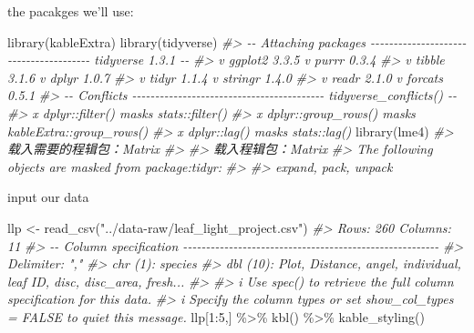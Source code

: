 \documentclass[
]{article}
\newenvironment{Shaded}{\begin{snugshade}}{\end{snugshade}}
\newcommand{\CommentTok}[1]{\textcolor[rgb]{0.56,0.35,0.01}{\textit{#1}}}
\newcommand{\DecValTok}[1]{\textcolor[rgb]{0.00,0.00,0.81}{#1}}
\newcommand{\FunctionTok}[1]{\textcolor[rgb]{0.00,0.00,0.00}{#1}}
\newcommand{\NormalTok}[1]{#1}
\newcommand{\OtherTok}[1]{\textcolor[rgb]{0.56,0.35,0.01}{#1}}
\newcommand{\SpecialCharTok}[1]{\textcolor[rgb]{0.00,0.00,0.00}{#1}}
\newcommand{\StringTok}[1]{\textcolor[rgb]{0.31,0.60,0.02}{#1}}
\begin{document}
the pacakges we'll use:

\begin{Shaded}
\begin{Highlighting}[]
\FunctionTok{library}\NormalTok{(kableExtra)}
\FunctionTok{library}\NormalTok{(tidyverse)}
\CommentTok{\#\textgreater{} {-}{-} Attaching packages {-}{-}{-}{-}{-}{-}{-}{-}{-}{-}{-}{-}{-}{-}{-}{-}{-}{-}{-}{-}{-}{-}{-}{-}{-}{-}{-}{-}{-}{-}{-}{-}{-}{-}{-}{-}{-}{-}{-} tidyverse 1.3.1 {-}{-}}
\CommentTok{\#\textgreater{} v ggplot2 3.3.5     v purrr   0.3.4}
\CommentTok{\#\textgreater{} v tibble  3.1.6     v dplyr   1.0.7}
\CommentTok{\#\textgreater{} v tidyr   1.1.4     v stringr 1.4.0}
\CommentTok{\#\textgreater{} v readr   2.1.0     v forcats 0.5.1}
\CommentTok{\#\textgreater{} {-}{-} Conflicts {-}{-}{-}{-}{-}{-}{-}{-}{-}{-}{-}{-}{-}{-}{-}{-}{-}{-}{-}{-}{-}{-}{-}{-}{-}{-}{-}{-}{-}{-}{-}{-}{-}{-}{-}{-}{-}{-}{-}{-}{-}{-} tidyverse\_conflicts() {-}{-}}
\CommentTok{\#\textgreater{} x dplyr::filter()     masks stats::filter()}
\CommentTok{\#\textgreater{} x dplyr::group\_rows() masks kableExtra::group\_rows()}
\CommentTok{\#\textgreater{} x dplyr::lag()        masks stats::lag()}
\FunctionTok{library}\NormalTok{(lme4)}
\CommentTok{\#\textgreater{} 载入需要的程辑包：Matrix}
\CommentTok{\#\textgreater{} }
\CommentTok{\#\textgreater{} 载入程辑包：\textquotesingle{}Matrix\textquotesingle{}}
\CommentTok{\#\textgreater{} The following objects are masked from \textquotesingle{}package:tidyr\textquotesingle{}:}
\CommentTok{\#\textgreater{} }
\CommentTok{\#\textgreater{}     expand, pack, unpack}
\end{Highlighting}
\end{Shaded}

input our data

\begin{Shaded}
\begin{Highlighting}[]
\NormalTok{llp }\OtherTok{\textless{}{-}} \FunctionTok{read\_csv}\NormalTok{(}\StringTok{"../data{-}raw/leaf\_light\_project.csv"}\NormalTok{)}
\CommentTok{\#\textgreater{} Rows: 260 Columns: 11}
\CommentTok{\#\textgreater{} {-}{-} Column specification {-}{-}{-}{-}{-}{-}{-}{-}{-}{-}{-}{-}{-}{-}{-}{-}{-}{-}{-}{-}{-}{-}{-}{-}{-}{-}{-}{-}{-}{-}{-}{-}{-}{-}{-}{-}{-}{-}{-}{-}{-}{-}{-}{-}{-}{-}{-}{-}{-}{-}{-}{-}{-}{-}{-}{-}}
\CommentTok{\#\textgreater{} Delimiter: ","}
\CommentTok{\#\textgreater{} chr  (1): species}
\CommentTok{\#\textgreater{} dbl (10): Plot, Distance, angel, individual, leaf ID, disc, disc\_area, fresh...}
\CommentTok{\#\textgreater{} }
\CommentTok{\#\textgreater{} i Use \textasciigrave{}spec()\textasciigrave{} to retrieve the full column specification for this data.}
\CommentTok{\#\textgreater{} i Specify the column types or set \textasciigrave{}show\_col\_types = FALSE\textasciigrave{} to quiet this message.}
\NormalTok{llp[}\DecValTok{1}\SpecialCharTok{:}\DecValTok{5}\NormalTok{,] }\SpecialCharTok{\%\textgreater{}\%} \FunctionTok{kbl}\NormalTok{() }\SpecialCharTok{\%\textgreater{}\%} \FunctionTok{kable\_styling}\NormalTok{()}
\end{Highlighting}
\end{Shaded}
\end{document}
